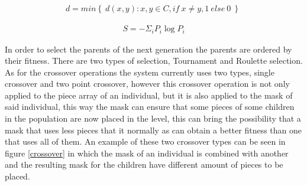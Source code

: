 \documentclass[conference]{IEEEtran}
\begin{document}
    \begin{equation}
        \begin{aligned}
        d = min \left\{ \ d(x,y): x,y \in C, if \: x \neq y, 1 \: else \: 0 \: \right\} \
        \end{aligned}
        \label{hamming_distance}
    \end{equation}
    
    \begin{equation}
        \begin{aligned}
        S = - \Sigma_i P_i \log P_i
        \end{aligned}
        \label{shannon_entropy}
    \end{equation}

    In order to select the parents of the next generation the parents are ordered by
    their fitness. There are two types of selection, Tournament and Roulette selection.
    As for the crossover operations the system currently uses two types, single
    crossover and two point crossover, however this crossover operation is
    not only applied to the piece array of an individual, but it is also applied to
    the mask of said individual, this way the mask can ensure that some pieces of
    some children in the population are now placed in the level, this can bring the
    possibility that a mask that uses less pieces that it normally as can obtain a
    better fitness than one that uses all of them. An example of these two crossover
    types can be seen in figure \ref{crossover} in which the mask of an individual
    is combined with another and the resulting mask for the children have different
    amount of pieces to be placed.
    
\end{document}
